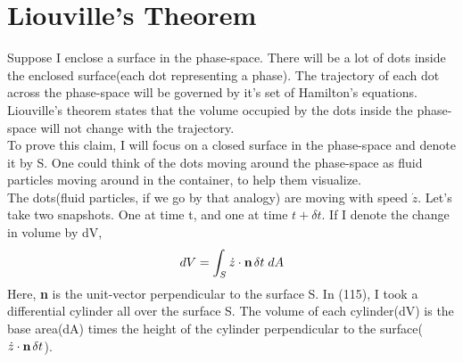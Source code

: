 \documentclass[12pt]{article}
\begin{document}
    \section{Liouville's Theorem}
    Suppose I enclose a surface in the phase-space. There will be a lot of dots inside the enclosed surface(each dot representing a phase). The trajectory of each dot across the phase-space will
    be governed by it's set of Hamilton's equations. Liouville's theorem states that the volume occupied by the dots inside the phase-space will not change with the trajectory.
    \\
    To prove this claim, I will focus on a closed surface in the phase-space and denote it by S. One could think of the dots moving around the phase-space as fluid particles moving around in the container, to help them visualize.\\
    The dots(fluid particles, if we go by that analogy) are moving with speed $\dot{z}$. Let's take two snapshots. One at time t, and one at time $t+\delta t$.
    If I denote the change in volume by dV,
    \begin{equation}
        dV = \int_{S}\dot{z}\cdot\mathbf{n}\hspace{0.05cm}\delta t\hspace{0.1cm}dA
    \end{equation}
    Here, \textbf{n} is the unit-vector perpendicular to the surface S. In (115), I took a differential cylinder all over the surface S. The volume of each cylinder(dV) is the base area(dA) times the height of the cylinder perpendicular to the surface($\dot{z}\cdot\mathbf{n}\hspace{0.05cm}\delta t$).
    
\end{document}
